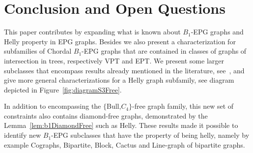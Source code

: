 \documentclass[9pt]{entcs}
\begin{document}
\section{Conclusion and Open Questions}

This paper contributes by expanding what is known about $B_1$-EPG graphs and Helly property in EPG graphs. Besides we also present a characterization for subfamilies of Chordal $B_1$-EPG graphs that are contained in classes of graphs of intersection in trees, respectively VPT and EPT. We present some larger subclasses that encompass results already mentioned in the literature, see~\cite{ries2009}, and give more general characterizations for a Helly graph subfamily, see diagram depicted in Figure~\ref{fig:diagramS3Free}. 
 
 In addition to encompassing the $\{$Bull,$C_4\}$-free graph family, this new set of constraints also contains diamond-free graphs, demonstrated by the Lemma~\ref{lem:b1DiamondFree} such as Helly. These results made it possible to identify new $B_1$-EPG subclasses that have the property of being helly, namely by example Cographs, Bipartite, Block, Cactus and Line-graph of bipartite graphs.
 


\newcommand{\newblock}{} %

\end{document}
